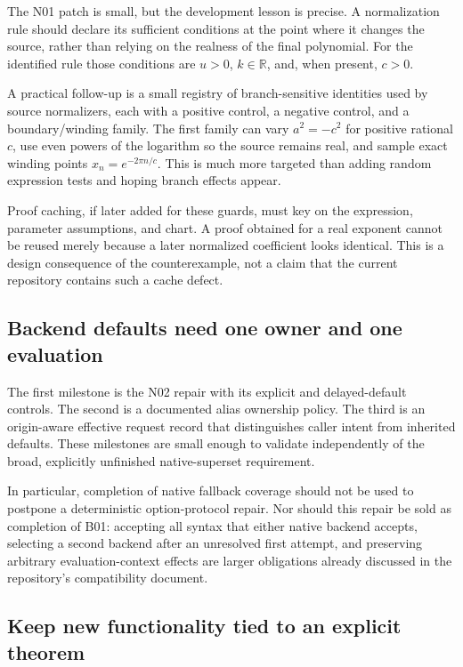 \documentclass[11pt,a4paper]{article}
\newcommand{\RR}{\mathbb{R}}
\begin{document}
The N01 patch is small, but the development lesson is precise. A normalization
rule should declare its sufficient conditions at the point where it changes the
source, rather than relying on the realness of the final polynomial. For the
identified rule those conditions are $u>0$, $k\in\RR$, and, when present, $c>0$.

A practical follow-up is a small registry of branch-sensitive identities used
by source normalizers, each with a positive control, a negative control, and a
boundary/winding family. The first family can vary $a^2=-c^2$ for positive
rational $c$, use even powers of the logarithm so the source remains real, and
sample exact winding points $x_n=e^{-2\pi n/c}$. This is much more targeted than
adding random expression tests and hoping branch effects appear.

Proof caching, if later added for these guards, must key on the expression,
parameter assumptions, and chart. A proof obtained for a real exponent cannot
be reused merely because a later normalized coefficient looks identical. This
is a design consequence of the counterexample, not a claim that the current
repository contains such a cache defect.

\subsection{Backend defaults need one owner and one evaluation}

The first milestone is the N02 repair with its explicit and delayed-default
controls. The second is a documented alias ownership policy. The third is an
origin-aware effective request record that distinguishes caller intent from
inherited defaults. These milestones are small enough to validate independently
of the broad, explicitly unfinished native-superset requirement.\cite{native,nativedoc}

In particular, completion of native fallback coverage should not be used to
postpone a deterministic option-protocol repair. Nor should this repair be sold
as completion of B01: accepting all syntax that either native backend accepts,
selecting a second backend after an unresolved first attempt, and preserving
arbitrary evaluation-context effects are larger obligations already discussed
in the repository's compatibility document.

\subsection{Keep new functionality tied to an explicit theorem}
\end{document}

